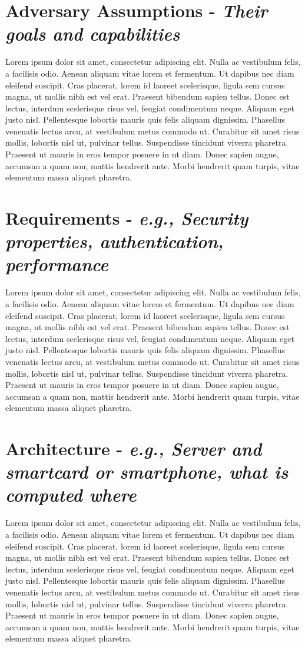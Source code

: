 \documentclass[9pt]{extarticle}
\begin{document}
\section{Adversary Assumptions - \textit{Their goals and capabilities}}
Lorem ipsum dolor sit amet, consectetur adipiscing elit. Nulla ac vestibulum felis, a facilisis odio. Aenean aliquam vitae lorem et fermentum. Ut dapibus nec diam eleifend suscipit. Cras placerat, lorem id laoreet scelerisque, ligula sem cursus magna, ut mollis nibh est vel erat. Praesent bibendum sapien tellus. Donec est lectus, interdum scelerisque risus vel, feugiat condimentum neque. Aliquam eget justo nisl. Pellentesque lobortis mauris quis felis aliquam dignissim. Phasellus venenatis lectus arcu, at vestibulum metus commodo ut. Curabitur sit amet risus mollis, lobortis nisl ut, pulvinar tellus. Suspendisse tincidunt viverra pharetra. Praesent ut mauris in eros tempor posuere in ut diam. Donec sapien augue, accumsan a quam non, mattis hendrerit ante. Morbi hendrerit quam turpis, vitae elementum massa aliquet pharetra. 

\section{Requirements - \textit{e.g., Security properties, authentication, performance}}
Lorem ipsum dolor sit amet, consectetur adipiscing elit. Nulla ac vestibulum felis, a facilisis odio. Aenean aliquam vitae lorem et fermentum. Ut dapibus nec diam eleifend suscipit. Cras placerat, lorem id laoreet scelerisque, ligula sem cursus magna, ut mollis nibh est vel erat. Praesent bibendum sapien tellus. Donec est lectus, interdum scelerisque risus vel, feugiat condimentum neque. Aliquam eget justo nisl. Pellentesque lobortis mauris quis felis aliquam dignissim. Phasellus venenatis lectus arcu, at vestibulum metus commodo ut. Curabitur sit amet risus mollis, lobortis nisl ut, pulvinar tellus. Suspendisse tincidunt viverra pharetra. Praesent ut mauris in eros tempor posuere in ut diam. Donec sapien augue, accumsan a quam non, mattis hendrerit ante. Morbi hendrerit quam turpis, vitae elementum massa aliquet pharetra. 

\section{Architecture - \textit{e.g., Server and smartcard or smartphone, what is computed where}}
Lorem ipsum dolor sit amet, consectetur adipiscing elit. Nulla ac vestibulum felis, a facilisis odio. Aenean aliquam vitae lorem et fermentum. Ut dapibus nec diam eleifend suscipit. Cras placerat, lorem id laoreet scelerisque, ligula sem cursus magna, ut mollis nibh est vel erat. Praesent bibendum sapien tellus. Donec est lectus, interdum scelerisque risus vel, feugiat condimentum neque. Aliquam eget justo nisl. Pellentesque lobortis mauris quis felis aliquam dignissim. Phasellus venenatis lectus arcu, at vestibulum metus commodo ut. Curabitur sit amet risus mollis, lobortis nisl ut, pulvinar tellus. Suspendisse tincidunt viverra pharetra. Praesent ut mauris in eros tempor posuere in ut diam. Donec sapien augue, accumsan a quam non, mattis hendrerit ante. Morbi hendrerit quam turpis, vitae elementum massa aliquet pharetra. 
\end{document}
